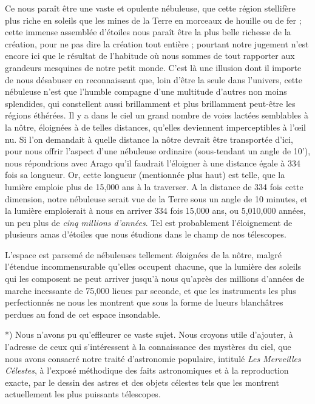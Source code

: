 \documentclass[a4paper, 11pt, oneside, landscape]{article}
\begin{document}
Ce nous paraît être une vaste et opulente nébuleuse, que cette région stellifère plus riche en soleils que les mines de la Terre en morceaux de houille ou de fer ; cette immense assemblée d'étoiles nous paraît être la plus belle richesse de la création, pour ne pas dire la création tout entière ; pourtant notre jugement n'est encore ici que le résultat de l'habitude où nous sommes de tout rapporter aux grandeurs mesquines de notre petit monde. C'est là une illusion dont il importe de nous désabuser en reconnaissant que, loin d'être la seule dans l'univers, cette nébuleuse n'est que l'humble compagne d'une multitude d'autres non moins splendides, qui constellent aussi brillamment et plus brillamment peut-être les régions éthérées. Il y a dans le ciel un grand nombre de voies lactées semblables à la nôtre, éloignées à de telles distances, qu'elles deviennent imperceptibles à l'œil nu. Si l'on demandait à quelle distance la nôtre devrait être transportée d'ici, pour nous offrir l'aspect d'une nébuleuse ordinaire (sous-tendant un angle de 10'), nous répondrions avec Arago qu'il faudrait l'éloigner à une distance égale à 334 fois sa longueur. Or, cette longueur (mentionnée plus haut) est telle, que la lumière emploie plus de 15,000 ans à la traverser. A la distance de 334 fois cette dimension, notre nébuleuse serait vue de la Terre sous un angle de 10 minutes, et la lumière emploierait à nous en arriver 334 fois 15,000 ans, ou 5,010,000 années, un peu plus de \emph{cinq millions d'années}. Tel est probablement l'éloignement de plusieurs amas d'étoiles que nous étudions dans le champ de nos télescopes.

L'espace est parsemé de nébuleuses tellement éloignées de la nôtre, malgré l'étendue incommensurable qu'elles occupent chacune, que la lumière des soleils qui les composent ne peut arriver jusqu'à nous qu'après des millions d'années de marche incessante de 75,000 lieues par seconde, et que les instruments les plus perfectionnés ne nous les montrent que sous la forme de lueurs blanchâtres perdues au fond de cet espace insondable.

*) Nous n'avons pu qu'effleurer ce vaste sujet. Nous croyons utile d'ajouter, à l'adresse de ceux qui s'intéressent à la connaissance des mystères du ciel, que nous avons consacré notre traité d'astronomie populaire, intitulé \emph{Les Merveilles Célestes}, à l'exposé méthodique des faits astronomiques et à la reproduction exacte, par le dessin des astres et des objets célestes tels que les montrent actuellement les plus puissants télescopes.
\end{document}
